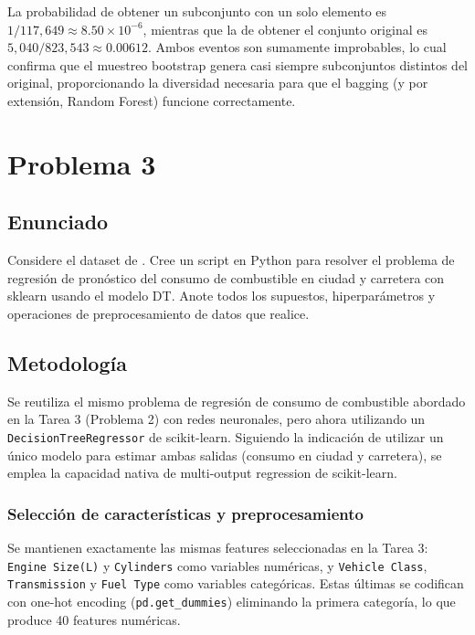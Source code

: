 \documentclass{article}
\begin{document}
La probabilidad de obtener un subconjunto con un solo elemento es $1/117{,}649 \approx 8.50 \times 10^{-6}$, mientras que la de obtener el conjunto original es $5{,}040/823{,}543 \approx 0.00612$. Ambos eventos son sumamente improbables, lo cual confirma que el muestreo bootstrap genera casi siempre subconjuntos distintos del original, proporcionando la diversidad necesaria para que el bagging (y por extensión, Random Forest) funcione correctamente.

\section{Problema 3}

\subsection{Enunciado}

Considere el dataset de \cite{kaggleFuel2022}. Cree un script en Python para resolver el problema de regresión de pronóstico del consumo de combustible en ciudad y carretera con sklearn usando el modelo DT. Anote todos los supuestos, hiperparámetros y operaciones de preprocesamiento de datos que realice.

\subsection{Metodología}

Se reutiliza el mismo problema de regresión de consumo de combustible abordado en la Tarea 3 (Problema 2) con redes neuronales, pero ahora utilizando un \texttt{DecisionTreeRegressor} de scikit-learn. Siguiendo la indicación de utilizar un único modelo para estimar ambas salidas (consumo en ciudad y carretera), se emplea la capacidad nativa de multi-output regression de scikit-learn.

\subsubsection{Selección de características y preprocesamiento}

Se mantienen exactamente las mismas features seleccionadas en la Tarea 3: \texttt{Engine Size(L)} y \texttt{Cylinders} como variables numéricas, y \texttt{Vehicle Class}, \texttt{Transmission} y \texttt{Fuel Type} como variables categóricas. Estas últimas se codifican con one-hot encoding (\texttt{pd.get\_dummies}) eliminando la primera categoría, lo que produce 40 features numéricas.
\end{document}
